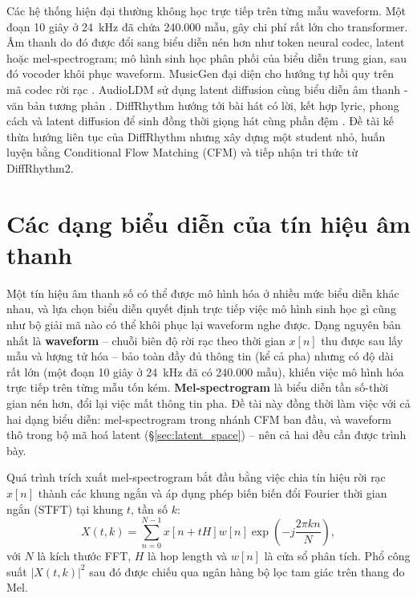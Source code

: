 \documentclass[a4paper,13pt,oneside]{report}
\begin{document}
Các hệ thống hiện đại thường không học trực tiếp trên từng mẫu waveform. Một đoạn 10 giây ở 24~kHz đã chứa 240.000 mẫu, gây chi phí rất lớn cho transformer. Âm thanh do đó được đổi sang biểu diễn nén hơn như token neural codec, latent hoặc mel-spectrogram; mô hình sinh học phân phối của biểu diễn trung gian, sau đó vocoder khôi phục waveform. MusicGen đại diện cho hướng tự hồi quy trên mã codec rời rạc \cite{musicgen}. AudioLDM sử dụng latent diffusion cùng biểu diễn âm thanh - văn bản tương phản \cite{audioldm}. DiffRhythm hướng tới bài hát có lời, kết hợp lyric, phong cách và latent diffusion để sinh đồng thời giọng hát cùng phần đệm \cite{diffrhythm}. Đề tài kế thừa hướng liên tục của DiffRhythm nhưng xây dựng một student nhỏ, huấn luyện bằng Conditional Flow Matching (CFM) và tiếp nhận tri thức từ DiffRhythm2.


\section{Các dạng biểu diễn của tín hiệu âm thanh}

Một tín hiệu âm thanh số có thể được mô hình hóa ở nhiều mức biểu diễn khác nhau, và lựa chọn biểu diễn quyết định trực tiếp việc mô hình sinh học gì cũng như bộ giải mã nào có thể khôi phục lại waveform nghe được. Dạng nguyên bản nhất là \textbf{waveform} -- chuỗi biên độ rời rạc theo thời gian $x[n]$ thu được sau lấy mẫu và lượng tử hóa -- bảo toàn đầy đủ thông tin (kể cả pha) nhưng có độ dài rất lớn (một đoạn 10 giây ở 24~kHz đã có 240.000 mẫu), khiến việc mô hình hóa trực tiếp trên từng mẫu tốn kém. \textbf{Mel-spectrogram} là biểu diễn tần số-thời gian nén hơn, đổi lại việc mất thông tin pha. Đề tài này đồng thời làm việc với cả hai dạng biểu diễn: mel-spectrogram trong nhánh CFM ban đầu, và waveform thô trong bộ mã hoá latent (\S\ref{sec:latent_space}) -- nên cả hai đều cần được trình bày.

Quá trình trích xuất mel-spectrogram bắt đầu bằng việc chia tín hiệu rời rạc $x[n]$ thành các khung ngắn và áp dụng phép biến biến đổi Fourier thời gian ngắn (STFT) tại khung $t$, tần số $k$:
\begin{equation}
 X(t,k)=\sum_{n=0}^{N-1} x[n+tH]w[n]\exp\left(-j\frac{2\pi kn}{N}\right),
\end{equation}
với $N$ là kích thước FFT, $H$ là hop length và $w[n]$ là cửa sổ phân tích. Phổ công suất $|X(t,k)|^2$ sau đó được chiếu qua ngân hàng bộ lọc tam giác trên thang đo Mel. 
\end{document}
